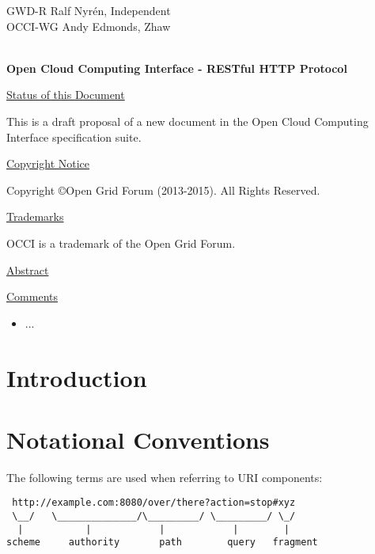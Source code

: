 \documentclass[10pt,a4paper]{article}
\begin{document}
\thispagestyle{empty}

GWD-R \hfill Ralf Nyrén, Independent \\
OCCI-WG \hfill Andy Edmonds, Zhaw \\
\\

\vspace*{0.5in}

\begin{Large}
\textbf{Open Cloud Computing Interface - RESTful HTTP Protocol}
\end{Large}

\vspace*{0.5in}

\underline{Status of this Document}

%
This is a draft proposal of a new document in the Open Cloud Computing
Interface specification suite.

\underline{Copyright Notice}

Copyright \copyright Open Grid Forum (2013-2015). All Rights Reserved.

\underline{Trademarks}

OCCI is a trademark of the Open Grid Forum.

\underline{Abstract}



\underline{Comments}
\begin{itemize}
\item ...
\end{itemize}

\newpage
\tableofcontents
\newpage

\section{Introduction}
%

\section{Notational Conventions}


The following terms \cite{rfc3986} are used when referring to URI
components:

\begin{verbatim}
 http://example.com:8080/over/there?action=stop#xyz
 \__/   \______________/\_________/ \_________/ \_/
  |           |            |            |        |
scheme     authority       path        query   fragment
\end{verbatim}
\end{document}
